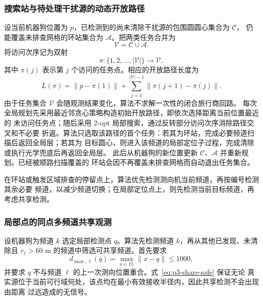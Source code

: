 \subsubsection{搜索站与待处理干扰源的动态开放路径}

设当前机器狗位置为 $p$，已检测到的尚未清除干扰源的包围圆圆心集合为 $\mathcal C$，
仍能覆盖未排查网格的环站集合为 $\mathcal A$。把两类任务合并为
\begin{equation}
\mathcal V=\mathcal C\cup\mathcal A.
\end{equation}
将访问次序记为双射
\begin{equation}
\pi:\{1,2,\ldots,|\mathcal V|\}\longrightarrow\mathcal V,
\end{equation}
其中 $\pi(j)$ 表示第 $j$ 个访问的任务点。相应的开放路径长度为
\begin{equation}
L(\pi)=\|p-\pi(1)\|+
\sum_{j=1}^{|\mathcal V|-1}\|\pi(j+1)-\pi(j)\|.
\label{eq:p3-open-route}
\end{equation}
由于任务集合 $\mathcal V$ 会随观测结果变化，算法不求解一次性的闭合旅行商回路。
每次全局规划先采用最近邻贪心策略构造初始开放路径，即依次选择距离当前位置最近的
未访问任务点；随后采用 2-opt 局部搜索，通过反转部分访问次序消除路径交叉和不必要
折返。算法只选取该路径的首个任务：若其为环站，完成必要频道扫描后返回全局层；若其为
目标圆心，则进入该频道的局部定位子过程，完成清除或执行光学兜底后再返回全局层。
此后从机器狗的新位置更新 $\mathcal C$、$\mathcal A$ 并重新规划。已经被顺路扫描覆盖的
环站会因不再覆盖未排查网格而自动退出任务集合。

在环站或触发区域排查的停留点上，算法优先检测测向机当前频道，再按编号检测其余必要
频道，以减少频道切换；在局部定位点上，则先检测当前目标频道，再考虑共享检测。

\subsubsection{局部点的同点多频道共享观测}

设机器狗为频道 $k$ 选定局部检测点 $q$。算法先检测频道 $k$，再从其他已发现、未清除且
$r_\ell>60$ m 的频道中筛选可共享频道。首先要求
\begin{equation}
d_{\max,\ell}(q)=\max_{x\in\Omega_\ell}\|x-q\|\le1000,
\label{eq:p3-share-safe}
\end{equation}
并要求 $q$ 不与频道 $\ell$ 的上一次测向位置重合。式~\eqref{eq:p3-share-safe} 保证无论
真实源位于当前可行域何处，该点均在最小有效接收半径内，因此共享检测不会出现由距离
过远造成的无信号。

